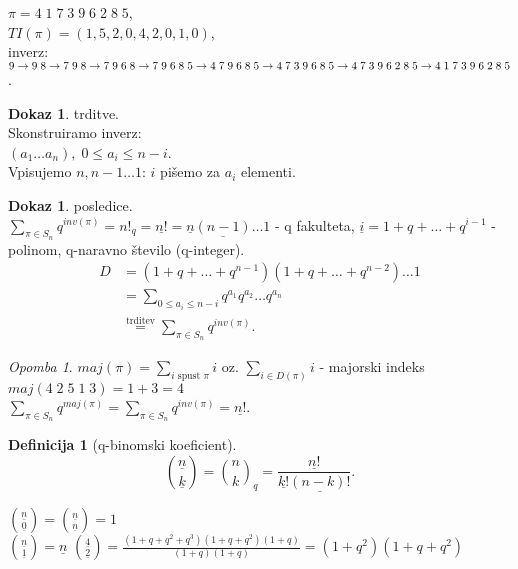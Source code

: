 \documentclass[a4paper, 12pt]{book}
\theoremstyle{definition}
\newtheorem{defn}[counter]{Definicija}
\newtheorem{pro}[counter]{Dokaz}
\theoremstyle{remark}
\newtheorem*{rem}{Opomba}
\begin{document}
$\pi = 4 \; 1 \; 7 \; 3 \; 9 \; 6 \; 2 \; 8 \; 5$, \\
$TI(\pi) = (1, 5, 2, 0, 4, 2, 0, 1, 0)$, \\
inverz: $9 \to 9 \; 8 \to 7 \; 9 \; 8 \to 7 \; 9 \; 6 \; 8 \to 7 \; 9 \; 6 \; 8 \; 5 \to 4 \; 7 \; 9 \; 6 \; 8 \; 5 \\
\to 4 \; 7 \; 3 \; 9 \; 6 \; 8 \; 5 \to 4 \; 7 \; 3 \; 9 \; 6 \; 2 \; 8 \; 5 \to 4 \;  1 \; 7 \; 3 \; 9 \; 6 \; 2 \; 8 \; 5$.
\begin{pro} trditve. \\
  Skonstruiramo inverz: \\
  $(a_1 \dots a_n), \; 0 \leq a_i \leq n-i$. \\
  Vpisujemo $n, n-1 \dots 1$: $i$ pišemo za $a_i$ elementi.
\end{pro}
\begin{pro} posledice. \\
  $\sum_{\pi \in S_n} q^{inv(\pi)} = n!_q = \underline{n!} = \underline{n} \underline{(n-1)} \dots 1$ - q fakulteta,
  $\underline{i} = 1 + q + \dots + q^{i-1}$ - polinom, q-naravno število (q-integer). \\
  \begin{align*}
    D &= (1 + q + \dots + q^{n-1}) (1 + q + \dots + q^{n-2}) \dots 1 \\
    &= \sum_{0 \leq a_i \leq n-i} q^{a_1} q^{a_2} \dots q^{a_n} \\
    &\stackrel{\text{trditev}}{=} \sum_{\pi \in S_n} q^{inv(\pi)}.
  \end{align*}
\end{pro}
\begin{rem}
  $maj(\pi) = \sum_{i \text{ spust } \pi} i$ oz. $\sum_{i \in D(\pi)} i$ - majorski indeks \\
  $maj(4 \; 2 \; 5 \; 1 \; 3) = 1 + 3 = 4$ \\
  $\sum_{\pi \in S_n} q^{maj(\pi)} = \sum_{\pi \in S_n} q^{inv(\pi)} = \underline{n!}$.
\end{rem}
\begin{defn}[q-binomski koeficient]
  \begin{equation*}
    \binom{\underline{n}}{\underline{k}} = \binom{n}{k}_q = \frac{\underline{n!}}{\underline{k!} \underline{(n-k)!}}.
  \end{equation*}
\end{defn}
$\binom{\underline{n}}{\underline{0}} = \binom{\underline{n}}{\underline{n}} = 1$ \\
$\binom{\underline{n}}{\underline{1}} = \underline{n}$
$\binom{\underline{4}}{\underline{2}} = \frac{(1 + q + q^2 + q^3)(1 + q + q^2) (1 + q)}{(1 + q)(1 + q)} = (1 + q^2) (1 + q + q^2)$
\end{document}
